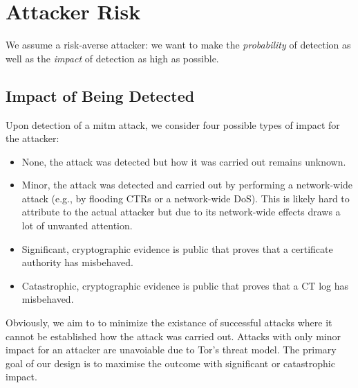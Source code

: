 \section{Attacker Risk} \label{sec:risk}
We assume a risk-averse attacker: we want to make the \emph{probability} of
detection as well as the \emph{impact} of detection as high as possible.

\subsection{Impact of Being Detected} \label{sec:risk:impact}
Upon detection of a mitm attack, we consider four possible types of impact for
the attacker:
\begin{itemize}
    \item None, the attack was detected but how it was carried out remains
    unknown.
    \item Minor, the attack was detected and carried out by performing a
    network-wide attack (e.g., by flooding CTRs or a network-wide DoS). This is
    likely hard to attribute to the actual attacker but due to its network-wide
    effects draws a lot of unwanted attention.
   \item Significant, cryptographic evidence is public that proves that a
   certificate authority has misbehaved.
   \item Catastrophic, cryptographic evidence is public that proves that a CT
   log has misbehaved.
\end{itemize}

Obviously, we aim to to minimize the existance of successful attacks where it
cannot be established how the attack was carried out. Attacks with only minor
impact for an attacker are unavoiable due to Tor's threat model. The primary
goal of our design is to maximise the outcome with significant or catastrophic
impact.


